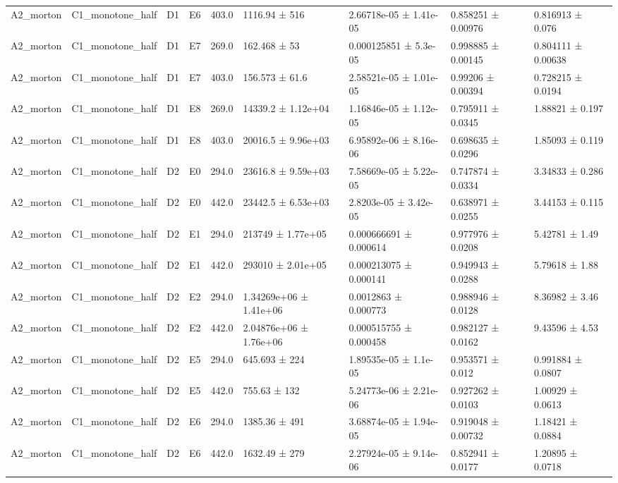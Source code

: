 \begin{table}
\begin{tabular}{lllllllll}
A2\_morton & C1\_monotone\_half & D1 & E6 & 403.0 & 1116.94 ± 516 & 2.66718e-05 ± 1.41e-05 & 0.858251 ± 0.00976 & 0.816913 ± 0.076 \\
A2\_morton & C1\_monotone\_half & D1 & E7 & 269.0 & 162.468 ± 53 & 0.000125851 ± 5.3e-05 & 0.998885 ± 0.00145 & 0.804111 ± 0.00638 \\
A2\_morton & C1\_monotone\_half & D1 & E7 & 403.0 & 156.573 ± 61.6 & 2.58521e-05 ± 1.01e-05 & 0.99206 ± 0.00394 & 0.728215 ± 0.0194 \\
A2\_morton & C1\_monotone\_half & D1 & E8 & 269.0 & 14339.2 ± 1.12e+04 & 1.16846e-05 ± 1.12e-05 & 0.795911 ± 0.0345 & 1.88821 ± 0.197 \\
A2\_morton & C1\_monotone\_half & D1 & E8 & 403.0 & 20016.5 ± 9.96e+03 & 6.95892e-06 ± 8.16e-06 & 0.698635 ± 0.0296 & 1.85093 ± 0.119 \\
A2\_morton & C1\_monotone\_half & D2 & E0 & 294.0 & 23616.8 ± 9.59e+03 & 7.58669e-05 ± 5.22e-05 & 0.747874 ± 0.0334 & 3.34833 ± 0.286 \\
A2\_morton & C1\_monotone\_half & D2 & E0 & 442.0 & 23442.5 ± 6.53e+03 & 2.8203e-05 ± 3.42e-05 & 0.638971 ± 0.0255 & 3.44153 ± 0.115 \\
A2\_morton & C1\_monotone\_half & D2 & E1 & 294.0 & 213749 ± 1.77e+05 & 0.000666691 ± 0.000614 & 0.977976 ± 0.0208 & 5.42781 ± 1.49 \\
A2\_morton & C1\_monotone\_half & D2 & E1 & 442.0 & 293010 ± 2.01e+05 & 0.000213075 ± 0.000141 & 0.949943 ± 0.0288 & 5.79618 ± 1.88 \\
A2\_morton & C1\_monotone\_half & D2 & E2 & 294.0 & 1.34269e+06 ± 1.41e+06 & 0.0012863 ± 0.000773 & 0.988946 ± 0.0128 & 8.36982 ± 3.46 \\
A2\_morton & C1\_monotone\_half & D2 & E2 & 442.0 & 2.04876e+06 ± 1.76e+06 & 0.000515755 ± 0.000458 & 0.982127 ± 0.0162 & 9.43596 ± 4.53 \\
A2\_morton & C1\_monotone\_half & D2 & E5 & 294.0 & 645.693 ± 224 & 1.89535e-05 ± 1.1e-05 & 0.953571 ± 0.012 & 0.991884 ± 0.0807 \\
A2\_morton & C1\_monotone\_half & D2 & E5 & 442.0 & 755.63 ± 132 & 5.24773e-06 ± 2.21e-06 & 0.927262 ± 0.0103 & 1.00929 ± 0.0613 \\
A2\_morton & C1\_monotone\_half & D2 & E6 & 294.0 & 1385.36 ± 491 & 3.68874e-05 ± 1.94e-05 & 0.919048 ± 0.00732 & 1.18421 ± 0.0884 \\
A2\_morton & C1\_monotone\_half & D2 & E6 & 442.0 & 1632.49 ± 279 & 2.27924e-05 ± 9.14e-06 & 0.852941 ± 0.0177 & 1.20895 ± 0.0718 \\

\end{tabular}
\end{table}
